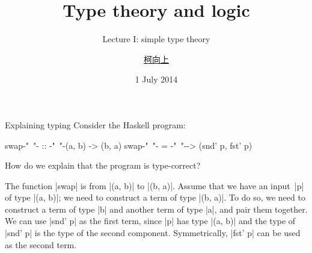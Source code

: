 \documentclass[t,compress,hyperref={hidelinks}]{beamer}
\begin{document}
\setcounter{framenumber}{-1}

\title{Type theory and logic}
\subtitle{Lecture I: simple type theory}
\date{1 July 2014}
\author{{\href{http://www.cs.ox.ac.uk/people/hsiang-shang.ko/}{柯向上}}}


{
\begin{frame}
\titlepage
\end{frame}}

\setlength\parskip{1.5ex minus .75ex}
\setlength{}
\setlength\belowdisplayskip{\abovedisplayskip}

\begin{frame}[fragile]{Explaining typing}
Consider the Haskell program:
\begin{code}
swap{-"~"-}  ::  {-"~"-}(a, b) -> (b, a)
swap{-"~"-}  =   {-"~"-}\p -> (snd' p, fst' p)
\end{code}
How do we explain that the program is type-correct?

\small
The function |swap| is from |(a, b)| to |(b, a)|.
Assume that we have an input~|p| of type |(a, b)|; we need to construct a term of type |(b, a)|.
To do so, we need to construct a term of type |b| and another term of type |a|, and pair them together.
We can use |snd' p| as the first term, since |p| has type |(a, b)| and the type of |snd' p| is the type of the second component.
Symmetrically, |fst' p| can be used as the second term.
\end{frame}
\end{document}
